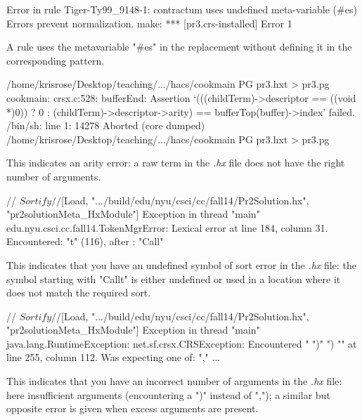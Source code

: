 \documentclass[11pt]{article} %
\begin{document}
\begin{error}\leavevmode
\begin{code}
Error in rule Tiger-Ty99_9148-1: contractum uses undefined meta-variable (#es)
Errors prevent normalization.
make: *** [pr3.crs-installed] Error 1
\end{code}
  A rule uses the metavariable "#es" in the replacement without defining it in the corresponding
  pattern.
\end{error}

\begin{error}[]\leavevmode
\begin{code}
/home/krisrose/Desktop/teaching/.../hacs/cookmain PG pr3.hxt > pr3.pg
cookmain: crsx.c:528: bufferEnd: Assertion
   `(((childTerm)->descriptor == ((void *)0)) ? 0 :
        (childTerm)->descriptor->arity) == bufferTop(buffer)->index' failed.
/bin/sh: line 1: 14278 Aborted
  (core dumped) /home/krisrose/Desktop/teaching/.../hacs/cookmain PG pr3.hxt > pr3.pg
\end{code}
  This indicates an arity error: a raw term in the \emph{.hx} file does not have the right number of
  arguments.
\end{error}

\begin{error}\leavevmode
\begin{code}
// $Sortify
// $[Load, ".../build/edu/nyu/csci/cc/fall14/Pr2Solution.hx", "pr2solutionMeta_HxModule"]
Exception in thread "main" edu.nyu.csci.cc.fall14.TokenMgrError:
   Lexical error at line 184, column 31.  Encountered: "t" (116), after : "Call"
\end{code}
This indicates that you have an undefined symbol of sort error in the \emph{.hx} file: the symbol
starting with "Callt" is either undefined or used in a location where it does not match the required
sort.
\end{error}

\begin{error}\leavevmode
\begin{code}
// $Sortify
// $[Load, ".../build/edu/nyu/csci/cc/fall14/Pr2Solution.hx", "pr2solutionMeta_HxModule"]
Exception in thread "main" java.lang.RuntimeException: net.sf.crsx.CRSException:
   Encountered " ")" ") "" at line 255, column 112.
Was expecting one of:
    "," ...
\end{code}
This indicates that you have an incorrect number of arguments in the \emph{.hx} file: here
insufficient arguments (encountering a ")" instead of ","); a similar but opposite error is given
when excess arguments are present.
\end{error}
\end{document}
